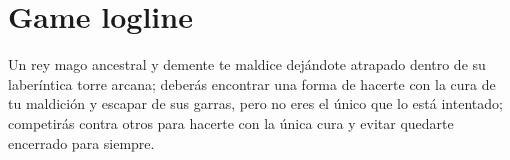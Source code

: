 \section{Game logline}%

Un rey mago ancestral y demente te maldice dejándote atrapado dentro de su
laberíntica torre arcana; deberás encontrar una forma de hacerte con la cura de
tu maldición y escapar de sus garras, pero no eres el único que lo está
intentado; competirás contra otros para hacerte con la única cura y evitar
quedarte encerrado para siempre.




